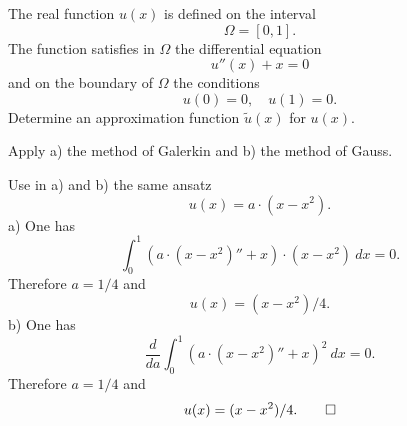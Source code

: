The real function $u(x)$ is defined on the interval
\[
\Omega = [0, 1].
\]
The function satisfies in $\Omega$ the differential equation
\[
u''(x) + x = 0
\]
and on the boundary of $\Omega$  the conditions
\[
u(0) = 0, \quad u(1) = 0.
\]
Determine an approximation function $\tilde u(x)$ for $u(x)$.

Apply a) the method of Galerkin and b) the method of Gauss. 

\begin{loesung}
Use in a) and b) the same ansatz
\[
u(x) = a \cdot (x - x^2).
\]
a) One has
\[
\int_0^1 (a \cdot (x - x^2)'' + x) \cdot (x - x^2) \ dx = 0.
\]
Therefore $a = 1/4$ and
\[
u(x) = (x - x^2)/4.
\]
b) One has
\[
\frac{d}{da} \int_0^1 (a \cdot (x - x^2)'' + x)^2 \ dx = 0.
\]
Therefore $a = 1/4$ and
\[
u(x) = (x - x^2)/4.
\qedhere
\]
\end{loesung}

